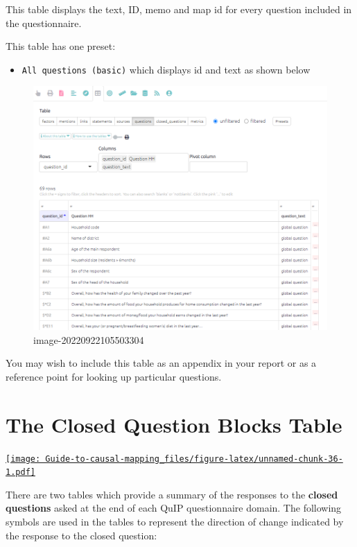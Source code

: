 \documentclass[
]{book}
\providecommand{\tightlist}{%
  \setlength{\itemsep}{0pt}\setlength{\parskip}{0pt}}
\begin{document}
This table displays the text, ID, memo and map id for every question included in the questionnaire.

This table has one preset:

\begin{itemize}
\tightlist
\item
  \texttt{All\ questions\ (basic)} which displays id and text as shown below
\end{itemize}

\begin{figure}
\centering
\includegraphics[width=6.77083in,height=\textheight]{_assets/image-20220922105503304.png}
\caption{image-20220922105503304}
\end{figure}

You may wish to include this table as an appendix in your report or as a reference point for looking up particular questions.

\hypertarget{xthe-closed-question-blocks-table-old}{%
\chapter{The Closed Question Blocks Table}\label{xthe-closed-question-blocks-table-old}}

\href{https://player.vimeo.com/video/596497752}{\texttt{[image: Guide-to-causal-mapping\_files/figure-latex/unnamed-chunk-36-1.pdf]}}

There are two tables which provide a summary of the responses to the \textbf{closed questions} asked at the end of each QuIP questionnaire domain. The following symbols are used in the tables to represent the direction of change indicated by the response to the closed question:
\end{document}
